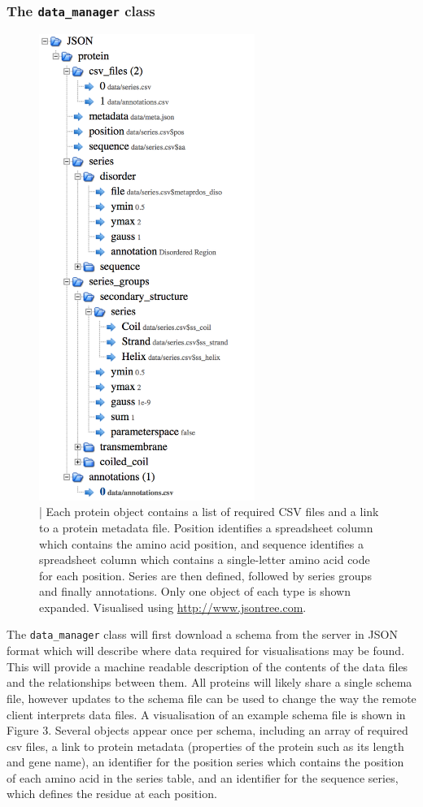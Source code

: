 \documentclass[fleqn,10pt]{article} %
\begin{document}
\subsubsection{The \texttt{data\_manager} class}

\begin{figure}
\includegraphics[width=7cm]{figs/schema}
\caption{ | Each protein object contains a list of required CSV files and a link to a protein metadata file. Position identifies a spreadsheet column which contains the amino acid position, and sequence identifies a spreadsheet column which contains a single-letter amino acid code for each position. Series are then defined, followed by series groups and finally annotations. Only one object of each type is shown expanded. Visualised using \url{http://www.jsontree.com}.}
\end{figure}

The \texttt{data\_manager} class will first download a schema from the server in JSON format which will describe where data required for visualisations may be found. This will provide a machine readable description of the contents of the data files and the relationships between them. All proteins will likely share a single schema file, however updates to the schema file can be used to change the way the remote client interprets data files. A visualisation of an example schema file is shown in Figure 3. Several objects appear once per schema, including an array of required csv files, a link to protein metadata (properties of the protein such as its length and gene name), an identifier for the position series which contains the position of each amino acid in the series table, and an identifier for the sequence series, which defines the residue at each position.
\end{document}
